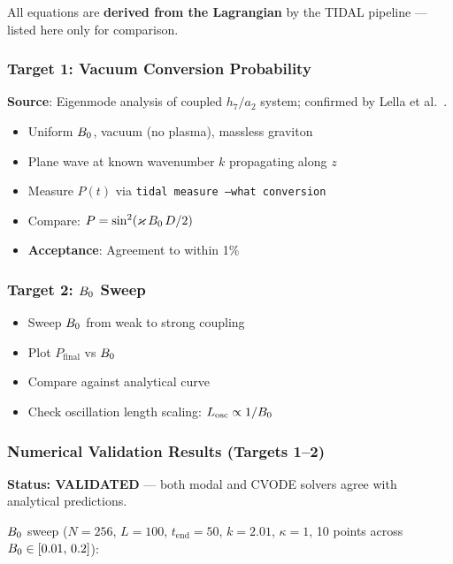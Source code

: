 All equations are \textbf{derived from the Lagrangian} by the TIDAL pipeline --- listed here only for comparison.

\subsubsection{Target 1: Vacuum Conversion Probability}
\label{subsec:target1}

\textbf{Source}: Eigenmode analysis of coupled $h_7/a_2$ system; confirmed by Lella et al.~\cite{lella2024constraining}.

\begin{itemize}
  \item Uniform $B_0$, vacuum (no plasma), massless graviton
  \item Plane wave at known wavenumber $k$ propagating along $z$
  \item Measure $P(t)$ via \texttt{tidal measure --what conversion}
  \item Compare: $P = \sin^2(\varkappa\,B_0\, D / 2)$
  \item \textbf{Acceptance}: Agreement to within 1\%
\end{itemize}

\subsubsection{Target 2: $B_0$ Sweep}
\label{subsec:target2}

\begin{itemize}
  \item Sweep $B_0$ from weak to strong coupling
  \item Plot $P_\mathrm{final}$ vs $B_0$
  \item Compare against analytical curve
  \item Check oscillation length scaling: $L_\mathrm{osc} \propto 1/B_0$
\end{itemize}

\subsubsection{Numerical Validation Results (Targets 1--2)}
\label{subsec:validation-results}

\textbf{Status: VALIDATED} --- both modal and CVODE solvers agree with analytical predictions.

$B_0$ sweep ($N = 256$, $L = 100$, $t_\mathrm{end} = 50$, $k = 2.01$, $\kappa = 1$, 10 points across $B_0 \in [0.01,\, 0.2]$):

